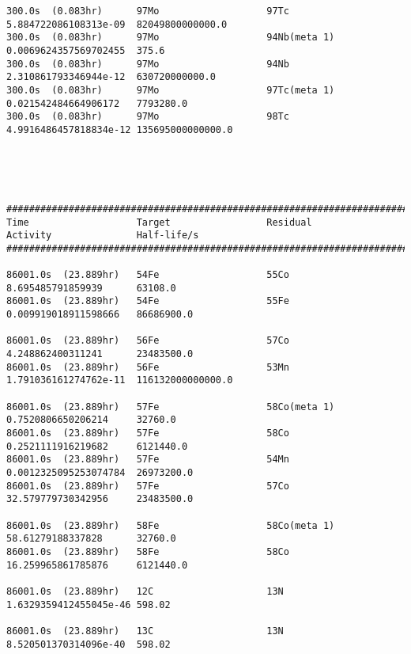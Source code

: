 \begin{lstlisting}[style=sOutputFile,caption={Final results for steel irradiation},label={listing:alexsteel}]
300.0s  (0.083hr)      97Mo                   97Tc                   5.884722086108313e-09  82049800000000.0      
300.0s  (0.083hr)      97Mo                   94Nb(meta 1)           0.0069624357569702455  375.6                 
300.0s  (0.083hr)      97Mo                   94Nb                   2.310861793346944e-12  630720000000.0        
300.0s  (0.083hr)      97Mo                   97Tc(meta 1)           0.021542484664906172   7793280.0             
300.0s  (0.083hr)      97Mo                   98Tc                   4.9916486457818834e-12 135695000000000.0     





####################################################################################################################
Time                   Target                 Residual               Activity               Half-life/s            
####################################################################################################################

86001.0s  (23.889hr)   54Fe                   55Co                   8.695485791859939      63108.0               
86001.0s  (23.889hr)   54Fe                   55Fe                   0.009919018911598666   86686900.0            

86001.0s  (23.889hr)   56Fe                   57Co                   4.248862400311241      23483500.0            
86001.0s  (23.889hr)   56Fe                   53Mn                   1.791036161274762e-11  116132000000000.0     

86001.0s  (23.889hr)   57Fe                   58Co(meta 1)           0.7520806650206214     32760.0               
86001.0s  (23.889hr)   57Fe                   58Co                   0.2521111916219682     6121440.0             
86001.0s  (23.889hr)   57Fe                   54Mn                   0.0012325095253074784  26973200.0            
86001.0s  (23.889hr)   57Fe                   57Co                   32.579779730342956     23483500.0            

86001.0s  (23.889hr)   58Fe                   58Co(meta 1)           58.61279188337828      32760.0               
86001.0s  (23.889hr)   58Fe                   58Co                   16.259965861785876     6121440.0             

86001.0s  (23.889hr)   12C                    13N                    1.6329359412455045e-46 598.02                

86001.0s  (23.889hr)   13C                    13N                    8.520501370314096e-40  598.02                


\end{lstlisting}
